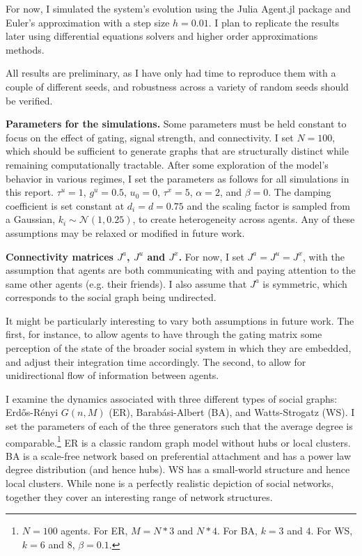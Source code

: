 \documentclass[]{article}
\begin{document}
For now, I simulated the system's evolution using the Julia Agent.jl package and Euler's approximation with a step size $h = 0.01$. I plan to replicate the results later using differential equations solvers and higher order approximations methods.

All results are preliminary, as I have only had time to reproduce them with a couple of different seeds, and robustness across a variety of random seeds should be verified.

\textbf{Parameters for the simulations.} Some parameters must be held constant to focus on the effect of gating, signal strength, and connectivity. I set $N = 100$, which should be sufficient to generate graphs that are structurally distinct while remaining computationally tractable. After some exploration of the model's behavior in various regimes, I set the parameters as follows for all simulations in this report. $\tau^u = 1$, $g^u = 0.5$, $u_0=0$, $\tau^x = 5$, $\alpha = 2$, and $\beta = 0$. The damping coefficient is set constant at $d_i = d = 0.75$ and the scaling factor is sampled from a Gaussian, $k_i \sim \mathcal{N}(1,0.25)$, to create heterogeneity across agents. Any of these assumptions may be relaxed or modified in future work. 

\textbf{Connectivity matrices $J^a$, $J^u$ and $J^x$.} For now, I set $J^a = J^u = J^x$, with the assumption that agents are both communicating with and paying attention to the same other agents (e.g. their friends). I also assume that $J^a$ is symmetric, which corresponds to the social graph being undirected.

It might be particularly interesting to vary both assumptions in future work. The first, for instance, to allow agents to have through the gating matrix some perception of the state of the broader social system in which they are embedded, and adjust their integration time accordingly. The second, to allow for unidirectional flow of information between agents.

I examine the dynamics associated with three different types of social graphs: Erdős-Rényi $G(n, M)$ (ER), Barabási-Albert (BA), and Watts-Strogatz (WS). I set the parameters of each of the three generators such that the average degree is comparable.\footnote{$N = 100$ agents. For ER, $M = N*3$ and $N*4$. For BA, $k = 3$ and $4$. For WS, $k = 6$ and $8$, $\beta = 0.1$.} ER is a classic random graph model without hubs or local clusters. BA is a scale-free network based on preferential attachment and has a power law degree distribution (and hence hubs). WS has a small-world structure and hence local clusters. While none is a perfectly realistic depiction of social networks, together they cover an interesting range of network structures.
\end{document}
